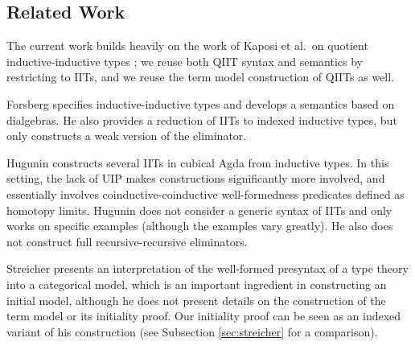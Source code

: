 \documentclass[a4paper,UKenglish,cleveref, autoref]{lipics-v2019}
\begin{document}



\subsection{Related Work}

The current work builds heavily on the work of Kaposi et al.\ on quotient
inductive-inductive types \cite{Kaposi:2019:CQI:3302515.3290315}; we reuse both
QIIT syntax and semantics by restricting to IITs, and we reuse the term model
construction of QIITs as well.

Forsberg \cite{forsberg-phd} specifies inductive-inductive types and develops a
semantics based on dialgebras. He also provides a reduction of IITs to indexed
inductive types, but only constructs a weak version of the eliminator.

Hugunin \cite{jasper} constructs several IITs in cubical Agda from inductive
types. In this setting, the lack of UIP makes constructions significantly more
involved, and essentially involves coinductive-coinductive well-formedness
predicates defined as homotopy limits. Hugunin does not consider a generic
syntax of IITs and only works on specific examples (although the examples vary
greatly). He also does not construct full recursive-recursive eliminators.

Streicher \cite{streichersemantics} presents an interpretation of the well-formed
presyntax of a type theory into a categorical model, which is an important
ingredient in constructing an initial model, although he does not present
details on the construction of the term model or its initiality proof. Our initiality proof can be seen as an indexed variant of his construction (see Subsection \ref{sec:streicher} for a comparison).
\end{document}
